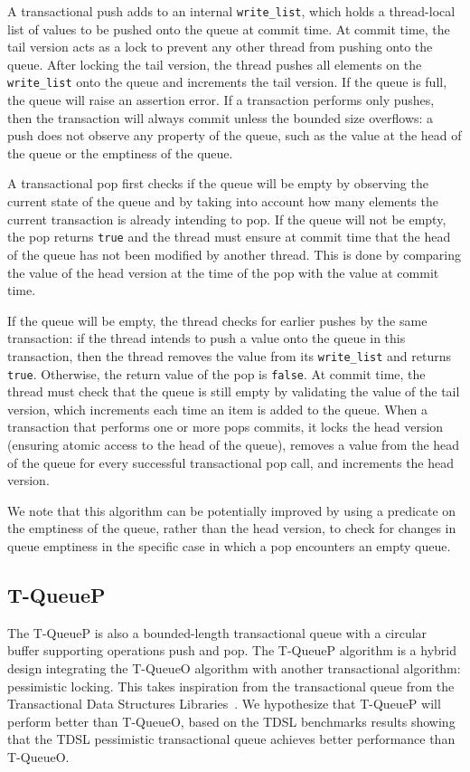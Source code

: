 A transactional push adds to an internal \texttt{write\_list}, which holds a thread-local list of values to be pushed onto the queue at commit time. At commit time, the tail version acts as a lock to prevent any other thread from pushing onto the queue. After locking the tail version, the thread pushes all elements on the \texttt{write\_list} onto the queue and increments the tail version. If the queue is full, the queue will raise an assertion error.
If a transaction performs only pushes, then the transaction will always commit unless the bounded size overflows: a push does not observe any property of the queue, such as the value at the head of the queue or the emptiness of the queue. 

A transactional pop first checks if the queue will be empty by observing the current state of the queue and by taking into account how many elements the current transaction is already intending to pop. If the queue will not be empty, the pop returns \texttt{true} and the thread must ensure at commit time that the head of the queue has not been modified by another thread. This is done by comparing the value of the head version at the time of the pop with the value at commit time. 

If the queue will be empty, the thread checks for earlier pushes by the same transaction: if the thread intends to push a value onto the queue in this transaction, then the thread removes the value from its \texttt{write\_list} and returns \texttt{true}. Otherwise, the return value of the pop is \texttt{false}. At commit time, the thread must check that the queue is still empty by validating the value of the tail version, which increments each time an item is added to the queue.
When a transaction that performs one or more pops commits, it locks the head version (ensuring atomic access to the head of the queue), removes a value from the head of the queue for every successful transactional pop call, and increments the head version.

We note that this algorithm can be potentially improved by using a predicate on the emptiness of the queue, rather than the head version, to check for changes in queue emptiness in the specific case in which a pop encounters an empty queue.


\subsection{T-QueueP}
The T-QueueP is also a bounded-length transactional queue with a circular buffer supporting operations push and pop. The T-QueueP algorithm is a hybrid design integrating the T-QueueO algorithm with another transactional algorithm: pessimistic locking. This takes inspiration from the transactional queue from the Transactional Data Structures Libraries~\cite{tdsl}. We hypothesize that T-QueueP will perform better than T-QueueO, based on the TDSL benchmarks results showing that the TDSL pessimistic transactional queue achieves better performance than T-QueueO. 

